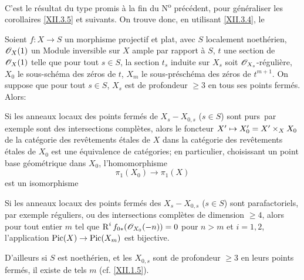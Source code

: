 C'est le r\'esultat du type promis \`a la fin du N\textsuperscript{o} pr\'ec\'edent, pour g\'en\'eraliser les corollaires \ref{XII.3.5} et suivants. On trouve donc, en utilisant \ref{XII.3.4}, le

\begin{corollaire} \label{XII.4.9}
Soient $f:X\to S$ un morphisme projectif et plat, avec $S$ localement noeth\'erien, $\mathscr{O}_X(1)$ un Module inversible sur $X$ ample par rapport \`a $S$, $t$ une section de $\mathscr{O}_X(1)$ telle que pour tout $s\in S$, la section $t_s$ induite sur $X_s$ soit ${\mathscr O}_{X_s}$-r\'eguli\`ere, $X_0$ le sous-sch\'ema des z\'eros de $t$, $X_m$ le sous-pr\'esch\'ema des z\'eros de $t^{m+1}$. On suppose que pour tout $s\in S$, $X_s$ est de profondeur $\geq 3$ en tous ses points ferm\'es. Alors:
\begin{enumeratea}
\item
Si les anneaux locaux des points ferm\'es de $X_s- X_{0, s}$ ($s\in S$) sont \og purs\fg\, par exemple sont des intersections compl\`etes, alors le foncteur $X'\mto X_0'=X'\times_X X_0$ de la cat\'egorie des rev\^etements \'etales de $X$ dans la cat\'egorie des rev\^etements \'etales de $X_0$ est une \'equivalence de cat\'egories; en particulier, choisissant un point base g\'eom\'etrique dans $X_0$, l'homomorphisme
\[
\pi_1(X_0)\to \pi_1(X)
\]
est un isomorphisme

\item
Si les anneaux locaux des points ferm\'es des $X_s- X_{0, s}$ ($s\in S$) sont \og parafactoriels\fg, par exemple r\'eguliers, ou des intersections compl\`etes de dimension $\geq 4$, alors pour tout entier $m$ tel que $\operatorname{R}^if_{0\ast}({\mathscr O}_{X_0}(-n))=0$ pour $n>m$ et $i=1, 2$, l'application $\Pic(X)\to \Pic(X_m)$ est bijective.

D'ailleurs si $S$ est noeth\'erien, et les $ X_{0, s}$ sont de profondeur $\geq 3$ en leurs points ferm\'es, il existe de tels $m$ (cf. \ref{XII.1.5}).
\end{enumeratea}
\end{corollaire}

